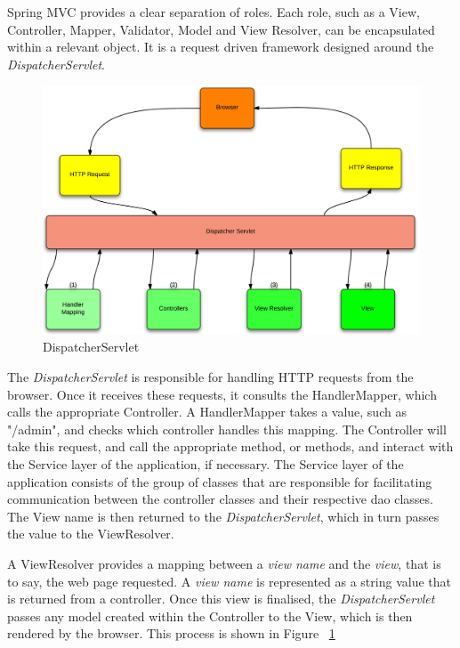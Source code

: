 Spring MVC provides a clear separation of roles. Each role, such as a View, Controller, Mapper, Validator, Model and View Resolver, can be encapsulated within a relevant object. It is a request driven framework designed around the \textit{DispatcherServlet}. 

\begin{figure}[H]
\begin{center}
\includegraphics[width=14cm]{dispatchservlet.png}
\end{center}
\caption{DispatcherServlet}
\label{fig:dispatcherflow}
\end{figure}

The \textit{DispatcherServlet} is responsible for handling HTTP requests from the browser. Once it receives these requests, it consults the HandlerMapper, which calls the appropriate Controller. A HandlerMapper takes a value, such as "/admin", and checks which controller handles this mapping. The Controller will take this request, and call the appropriate method, or methods, and interact with the Service layer of the application, if necessary. The Service layer of the application consists of the group of classes that are responsible for facilitating communication between the controller classes and their respective dao classes. The View name is then returned to the \textit{DispatcherServlet}, which in turn passes the value to the ViewResolver. 

A ViewResolver provides a mapping between a \textit{view name} and the \textit{view}, that is to say, the web page requested. A \textit{view name} is represented as a string value that is returned from a controller. Once this view is finalised, the \textit{DispatcherServlet} passes any model created within the Controller to the View, which is then rendered by the browser. This process is shown in Figure ~\ref{fig:dispatcherflow}


